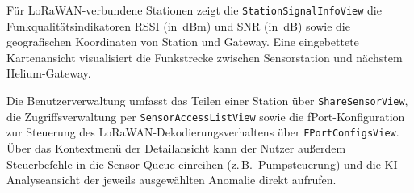   Für LoRaWAN-verbundene Stationen zeigt die                                                                                                         
  \texttt{StationSignalInfoView} die Funkqualitätsindikatoren RSSI                                                                                   
  (in~dBm) und SNR (in~dB) sowie die geografischen Koordinaten von Station                                                                           
  und Gateway. Eine eingebettete Kartenansicht visualisiert die                                                                                      
  Funkstrecke zwischen Sensorstation und nächstem Helium-Gateway.                                                                                    
                                                                                                                                                     
  Die Benutzerverwaltung umfasst das Teilen einer Station über                                                                                       
  \texttt{ShareSensorView}, die Zugriffsverwaltung per                                                                                               
  \texttt{SensorAccessListView} sowie die fPort-Konfiguration zur                                                                                    
  Steuerung des LoRaWAN-Dekodierungsverhaltens über                                                                                                  
  \texttt{FPortConfigsView}. Über das Kontextmenü der Detailansicht kann                                                                             
  der Nutzer außerdem Steuerbefehle in die Sensor-Queue einreihen                                                                                    
  (z.\,B.\ Pumpsteuerung) und die KI-Analyseansicht der jeweils                                                                                      
  ausgewählten Anomalie direkt aufrufen. 